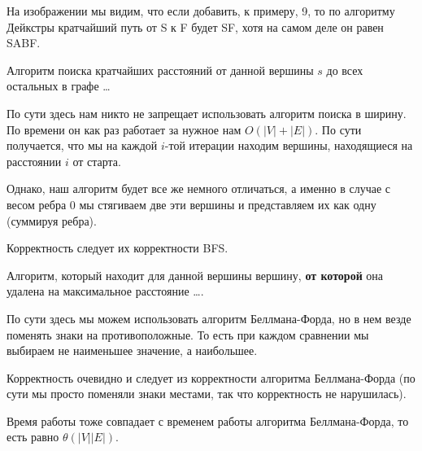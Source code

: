 \documentclass[12pt]{extreport}
\theoremstyle{definiton}
\theoremstyle{definition}
\theoremstyle{definition}
\newcounter{problem}
\newcounter{subproblem}
\def\beforPRskip{
	\bigskip
}
\def\pr{\beforPRskip\noindent\stepcounter{problem}{\bf \theproblem .\;}\setcounter{subproblem}{0}}
\begin{document}
	На изображении мы видим, что если добавить, к примеру, 9, то по алгоритму Дейкстры кратчайший путь от S к F будет SF, хотя на самом деле он равен SABF.

\pr Алгоритм поиска кратчайших расстояний от данной вершины $s$ до всех остальных в графе \ldots

	По сути здесь нам никто не запрещает использовать алгоритм поиска в ширину. По времени он как раз работает за нужное нам $O(|V| + |E|)$. По сути получается, что мы на каждой $i$-той итерации находим вершины, находящиеся на расстоянии $i$ от старта.

	Однако, наш алгоритм будет все же немного отличаться, а именно в случае с весом ребра $0$ мы стягиваем две эти вершины и представляем их как одну (суммируя ребра).

	Корректность следует их корректности BFS.


\pr Алгоритм, который находит для данной вершины вершину, \textbf{от которой} она удалена на максимальное расстояние \ldots.

	По сути здесь мы можем использовать алгоритм Беллмана-Форда, но в нем везде поменять знаки на противоположные. То есть при каждом сравнении мы выбираем не наименьшее значение, а наибольшее.

	Корректность очевидно и следует из корректности алгоритма Беллмана-Форда (по сути мы просто поменяли знаки местами, так что корректность не нарушилась).

	Время работы тоже совпадает с временем работы алгоритма Беллмана-Форда, то есть равно $\theta(|V||E|)$.
\end{document}
